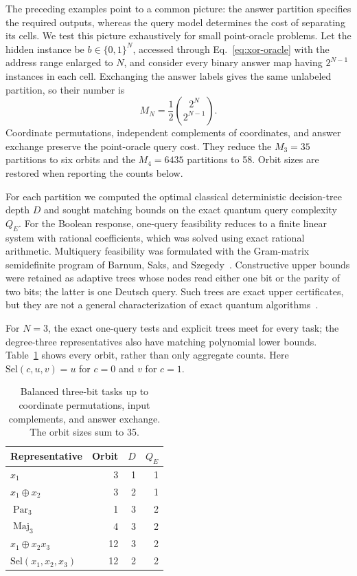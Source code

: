 \documentclass[
  aps,
  prl,
  reprint,
  nofootinbib
]{revtex4-2}
\begin{document}
The preceding examples point to a common picture: the answer partition specifies
the required outputs, whereas the query model determines the cost of separating
its cells. We test this picture exhaustively for small point-oracle problems. Let the hidden instance be
\(b\in\{0,1\}^N\), accessed through Eq.~\eqref{eq:xor-oracle} with the address
range enlarged to \(N\), and consider every binary answer map having
\(2^{N-1}\) instances in each cell. Exchanging the answer labels gives the same
unlabeled partition, so their number is
\begin{equation}
 M_N=\frac12\binom{2^N}{2^{N-1}}.
 \label{eq:balanced-count}
\end{equation}
Coordinate permutations, independent complements of coordinates, and answer
exchange preserve the point-oracle query cost. They reduce the \(M_3=35\)
partitions to six orbits and the \(M_4=6435\) partitions to 58. Orbit sizes are
restored when reporting the counts below.

For each partition we computed the optimal classical deterministic
decision-tree depth \(D\) and sought matching bounds on the exact quantum query
complexity \(Q_E\). For the Boolean response, one-query feasibility reduces to
a finite linear system with rational coefficients, which was solved using exact
rational arithmetic. Multiquery feasibility was formulated with the
Gram-matrix semidefinite program of Barnum, Saks, and
Szegedy~\cite{BarnumSaksSzegedy2003}. Constructive upper bounds were retained
as adaptive trees whose nodes read either one bit or the parity of two bits;
the latter is one Deutsch query. Such trees are exact upper certificates, but
they are not a general characterization of exact quantum
algorithms~\cite{MontanaroJozsaMitchison2015}.

For \(N=3\), the exact one-query tests and explicit trees meet for every task;
the degree-three representatives also have matching polynomial lower bounds.
Table~\ref{tab:n3} shows every orbit, rather than only aggregate counts. Here
\(\mathrm{Sel}(c,u,v)=u\) for \(c=0\) and \(v\) for \(c=1\).

\begin{table}[t]
\caption{Balanced three-bit tasks up to coordinate permutations, input
complements, and answer exchange. The orbit sizes sum to 35.}
\label{tab:n3}
\begin{ruledtabular}
\begin{tabular}{lrrr}
Representative & Orbit & \(D\) & \(Q_E\)\\
\hline
\(x_1\) & 3 & 1 & 1\\
\(x_1\mathbin\oplus x_2\) & 3 & 2 & 1\\
\(\operatorname{Par}_3\) & 1 & 3 & 2\\
\(\operatorname{Maj}_3\) & 4 & 3 & 2\\
\(x_1\mathbin\oplus x_2x_3\) & 12 & 3 & 2\\
\(\mathrm{Sel}(x_1,x_2,x_3)\) & 12 & 2 & 2\\
\end{tabular}
\end{ruledtabular}
\end{table}
\end{document}
